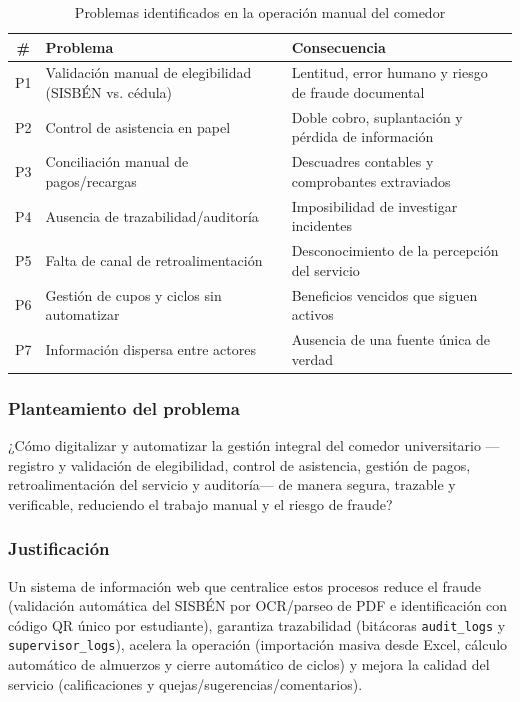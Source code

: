 \documentclass[stu,11pt,floatsintext]{apa7}
\begin{document}
\begin{table}[H]
\centering
\caption{Problemas identificados en la operación manual del comedor}
\label{tab:problemas}
\begin{tabularx}{\textwidth}{c L{0.45\textwidth} X}
\toprule
\textbf{\#} & \textbf{Problema} & \textbf{Consecuencia} \\
\midrule
P1 & Validación manual de elegibilidad (SISBÉN vs. cédula) & Lentitud, error humano y riesgo de fraude documental \\
P2 & Control de asistencia en papel & Doble cobro, suplantación y pérdida de información \\
P3 & Conciliación manual de pagos/recargas & Descuadres contables y comprobantes extraviados \\
P4 & Ausencia de trazabilidad/auditoría & Imposibilidad de investigar incidentes \\
P5 & Falta de canal de retroalimentación & Desconocimiento de la percepción del servicio \\
P6 & Gestión de cupos y ciclos sin automatizar & Beneficios vencidos que siguen activos \\
P7 & Información dispersa entre actores & Ausencia de una fuente única de verdad \\
\bottomrule
\end{tabularx}
\end{table}

\subsubsection{Planteamiento del problema}
¿Cómo digitalizar y automatizar la gestión integral del comedor universitario
—registro y validación de elegibilidad, control de asistencia, gestión de pagos,
retroalimentación del servicio y auditoría— de manera segura, trazable y verificable,
reduciendo el trabajo manual y el riesgo de fraude?

\subsubsection{Justificación}
Un sistema de información web que centralice estos procesos reduce el fraude (validación
automática del SISBÉN por OCR/parseo de PDF e identificación con código QR único por
estudiante), garantiza trazabilidad (bitácoras \texttt{audit\_logs} y
\texttt{supervisor\_logs}), acelera la operación (importación masiva desde Excel, cálculo
automático de almuerzos y cierre automático de ciclos) y mejora la calidad del servicio
(calificaciones y quejas/sugerencias/comentarios).
\end{document}
